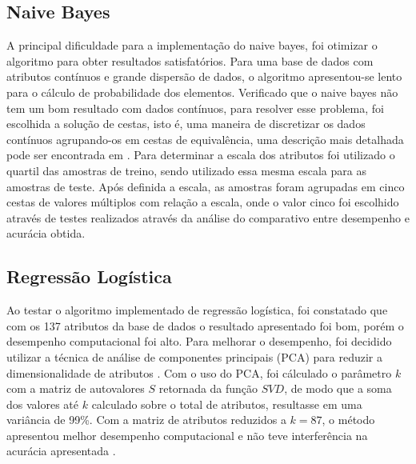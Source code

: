 \documentclass[10pt, conference, compsocconf]{IEEEtran}
\begin{document}
\subsection{Naive Bayes}
A principal dificuldade para a implementação do naive bayes, foi otimizar o algoritmo para obter resultados satisfatórios. Para uma base de dados com atributos contínuos e grande dispersão de dados, o algoritmo apresentou-se lento para o cálculo de probabilidade dos elementos. 
Verificado que o naive bayes não tem um bom resultado com dados contínuos, para resolver esse problema, foi escolhida a solução de cestas, isto é, uma maneira de discretizar os dados contínuos agrupando-os em cestas de equivalência, uma descrição mais detalhada pode ser encontrada em \cite{8}. 
Para determinar a escala dos atributos foi utilizado o quartil das amostras de treino, sendo utilizado essa mesma escala para as amostras de teste. Após definida a escala, as amostras foram agrupadas em cinco cestas de valores múltiplos com relação a escala, onde o valor cinco foi escolhido através de testes realizados através da análise do comparativo entre desempenho e acurácia obtida.
\subsection{Regressão Logística}
Ao testar o algoritmo implementado de regressão logística, foi constatado que com os 137 atributos da base de dados o resultado apresentado foi bom, porém o desempenho computacional foi alto. Para melhorar o desempenho, foi decidido utilizar a técnica de análise de componentes principais (PCA) para reduzir a dimensionalidade de atributos \cite{9}. 
Com o uso do PCA, foi cálculado o parâmetro $k$ com a matriz de autovalores $S$ retornada da função $SVD$, de modo que a soma dos valores até $k$ calculado sobre o total de atributos, resultasse em uma variância de 99\%. Com a matriz de atributos reduzidos a $k=87$, o  método apresentou melhor desempenho computacional e não teve interferência na acurácia apresentada . 
\end{document}
